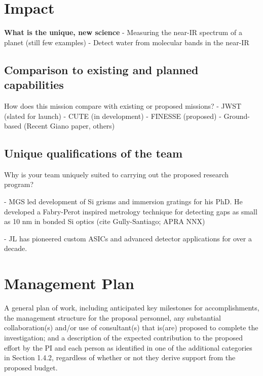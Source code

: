 \documentclass[12pt]{article}
\begin{document}
\section{Impact}

\textbf{What is the unique, new science}
- Measuring the near-IR spectrum of a planet (still few examples)
- Detect water from molecular bands in the near-IR

\subsection{Comparison to existing and planned capabilities}

How does this mission compare with existing or proposed missions?
- JWST  (slated for launch)
- CUTE (in development)
- FINESSE (proposed)
- Ground-based (Recent Giano paper, others)

\subsection{Unique qualifications of the team}
Why is your team uniquely suited to carrying out the proposed research program?

- MGS led development of Si grisms and immersion gratings for his PhD.  He developed a Fabry-Perot inspired metrology technique for detecting gaps as small as 10 nm in bonded Si optics (cite Gully-Santiago; APRA NNX)

- JL has pioneered custom ASICs and advanced detector applications for over a decade.


\section{Management Plan}
\label{sec:management}
A general plan of work, including anticipated key milestones for
accomplishments, the management structure for the proposal personnel,
any substantial collaboration(s) and/or use of consultant(s) that
is(are) proposed to complete the investigation; and a description of
the expected contribution to the proposed effort by the PI and each
person as identified in one of the additional categories in Section
1.4.2, regardless of whether or not they derive support from the
proposed budget.





\cleardoublepage
\end{document}
